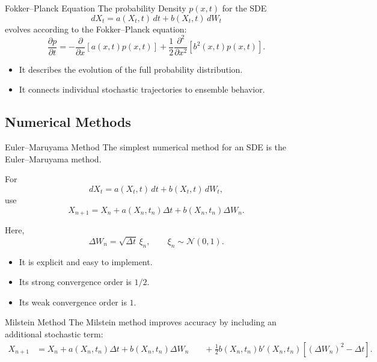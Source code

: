 \documentclass[a4paper, 10pt, onepage]{elegantbook}
\begin{document}
{\begin{frame}{Fokker--Planck Equation}
  The probability Density \(p(x,t)\) for the SDE
  \[
    dX_t=a(X_t,t)\,dt+b(X_t,t)\,dW_t
  \]
  evolves according to the Fokker--Planck equation:
  \[
    \frac{\partial p}{\partial t}
    =
    -
    \frac{\partial}{\partial x}
    \left[a(x,t)p(x,t)\right]
    +
    \frac{1}{2}
    \frac{\partial^2}{\partial x^2}
    \left[
      b^2(x,t)p(x,t)
    \right].
  \]

  \begin{itemize}
    \item It describes the evolution of the full probability distribution.
    \item It connects individual stochastic trajectories to ensemble behavior.
  \end{itemize}
\end{frame}

\subsection{Numerical Methods}

\begin{frame}{Euler--Maruyama Method}
  The simplest numerical method for an SDE is the Euler--Maruyama method.

  For
  \[
    dX_t=a(X_t,t)\,dt+b(X_t,t)\,dW_t,
  \]
  use
  \[
    X_{n+1}
    =
    X_n
    +
    a(X_n,t_n)\Delta t
    +
    b(X_n,t_n)\Delta W_n.
  \]

  Here,
  \[
    \Delta W_n
    =
    \sqrt{\Delta t}\,\xi_n,
    \qquad
    \xi_n\sim\mathcal{N}(0,1).
  \]

  \begin{itemize}
    \item It is explicit and easy to implement.
    \item Its strong convergence order is \(1/2\).
    \item Its weak convergence order is \(1\).
  \end{itemize}
\end{frame}

\begin{frame}{Milstein Method}
  The Milstein method improves accuracy by including an additional stochastic term:
  \[
    \begin{aligned}
      X_{n+1}
      &=
      X_n
      +
      a(X_n,t_n)\Delta t
      +
      b(X_n,t_n)\Delta W_n 
      &\quad+
      \frac{1}{2}
      b(X_n,t_n)b'(X_n,t_n)
      \left[
        (\Delta W_n)^2-\Delta t
      \right].
    \end{aligned}
  \]


\end{frame}}
\end{document}
